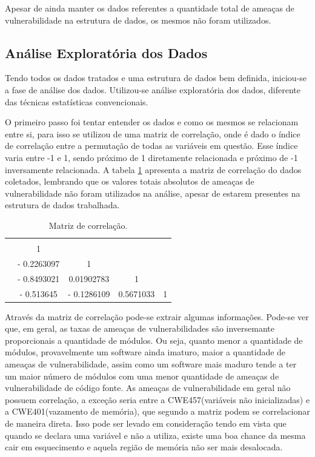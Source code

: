 Apesar de ainda manter os dados referentes a quantidade total de ameaças de
vulnerabilidade na estrutura de dados, os mesmos não foram utilizados.

\subsection{Análise Exploratória dos Dados}\label{eda}

Tendo todos os dados tratados e uma estrutura de dados bem definida, iniciou-se
a fase de análise dos dados. Utilizou-se análise exploratória dos dados,
diferente das técnicas estatísticas convencionais.

O primeiro passo foi tentar entender os dados e como os mesmos se relacionam
entre si, para isso se utilizou de uma matriz de correlação, onde é dado o
índice de correlação entre a permutação de todas as variáveis em questão. Esse
índice varia entre -1 e 1, sendo próximo de 1 diretamente relacionada e próximo de
-1 inversamente relacionada. A tabela \ref{tab:correlacao} apresenta a matriz de
correlação do dados coletados, lembrando que os valores totais absolutos de
ameaças de vulnerabilidade não foram utilizados na análise, apesar de estarem
presentes na estrutura de dados trabalhada.

\begin{table}[h]
\centering
\begin{tabular}{ccccl}
 & \cellcolor[HTML]{EFEFEF}{Modules} & \cellcolor[HTML]{EFEFEF}{tax\_CWE476} & \cellcolor[HTML]{EFEFEF}{tax\_CWE457} & \multicolumn{1}{c}{\cellcolor[HTML]{EFEFEF}{tax\_CWE401}} \\
\cellcolor[HTML]{EFEFEF}{Modules} & 1 & \multicolumn{1}{l}{} & \multicolumn{1}{l}{} &  \\
\cellcolor[HTML]{EFEFEF}{tax\_CWE476} & - 0.2263097 & 1 & \multicolumn{1}{l}{} &  \\
\cellcolor[HTML]{EFEFEF}{tax\_CWE457} & - 0.8493021 & 0.01902783 & 1 &  \\
\cellcolor[HTML]{EFEFEF}{tax\_CWE401} & - 0.513645 & - 0.1286109 & 0.5671033 & \multicolumn{1}{c}{1}
\end{tabular}
\caption{Matriz de correlação.}
\label{tab:correlacao}
\end{table}

Através da matriz de correlação pode-se extrair algumas informações. Pode-se ver
que, em geral, as taxas de ameaças de vulnerabilidades são inversemante
proporcionais a quantidade de módulos. Ou seja, quanto menor a quantidade de
módulos, provavelmente um software ainda imaturo, maior a quantidade de ameaças
de vulnerabilidade, assim como um software mais maduro tende a ter um maior
número de módulos com uma menor quantidade de ameaças de vulnerabilidade de
código fonte. As ameaças de vulnerabilidade em geral não possuem correlação, a
exceção seria entre a CWE457(variáveis não inicializadas) e a CWE401(vazamento
de memória), que segundo a matriz podem se correlacionar de maneira direta. Isso
pode ser levado em consideração tendo em vista que quando se declara uma
variável e não a utiliza, existe uma boa chance da mesma cair em esquecimento e
aquela região de memória não ser mais desalocada.

